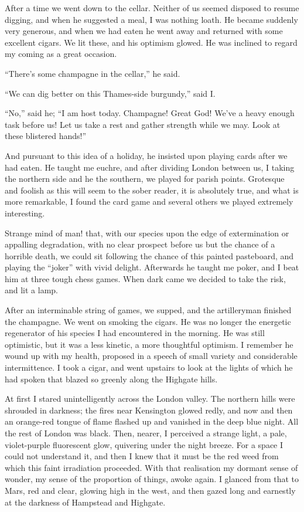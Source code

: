 After a time we went down to the cellar. Neither of us seemed
disposed to resume digging, and when he suggested a meal, I was
nothing loath. He became suddenly very generous, and when we had
eaten he went away and returned with some excellent cigars. We lit
these, and his optimism glowed. He was inclined to regard my coming
as a great occasion.

``There's some champagne in the cellar,'' he said.

``We can dig better on this Thames-side burgundy,'' said I.

``No,'' said he; ``I am host today. Champagne! Great God! We've a
heavy enough task before us! Let us take a rest and gather strength
while we may. Look at these blistered hands!''

And pursuant to this idea of a holiday, he insisted upon playing
cards after we had eaten. He taught me euchre, and after dividing
London between us, I taking the northern side and he the southern,
we played for parish points. Grotesque and foolish as this will
seem to the sober reader, it is absolutely true, and what is more
remarkable, I found the card game and several others we played
extremely interesting.

Strange mind of man! that, with our species upon the edge of
extermination or appalling degradation, with no clear prospect
before us but the chance of a horrible death, we could sit
following the chance of this painted pasteboard, and playing the
``joker'' with vivid delight. Afterwards he taught me poker, and I
beat him at three tough chess games. When dark came we decided to
take the risk, and lit a lamp.

After an interminable string of games, we supped, and the
artilleryman finished the champagne. We went on smoking the cigars.
He was no longer the energetic regenerator of his species I had
encountered in the morning. He was still optimistic, but it was a
less kinetic, a more thoughtful optimism. I remember he wound up
with my health, proposed in a speech of small variety and
considerable intermittence. I took a cigar, and went upstairs to
look at the lights of which he had spoken that blazed so greenly
along the Highgate hills.

At first I stared unintelligently across the London valley. The
northern hills were shrouded in darkness; the fires near Kensington
glowed redly, and now and then an orange-red tongue of flame
flashed up and vanished in the deep blue night. All the rest of
London was black. Then, nearer, I perceived a strange light, a
pale, violet-purple fluorescent glow, quivering under the night
breeze. For a space I could not understand it, and then I knew that
it must be the red weed from which this faint irradiation
proceeded. With that realisation my dormant sense of wonder, my
sense of the proportion of things, awoke again. I glanced from that
to Mars, red and clear, glowing high in the west, and then gazed
long and earnestly at the darkness of Hampstead and Highgate.

